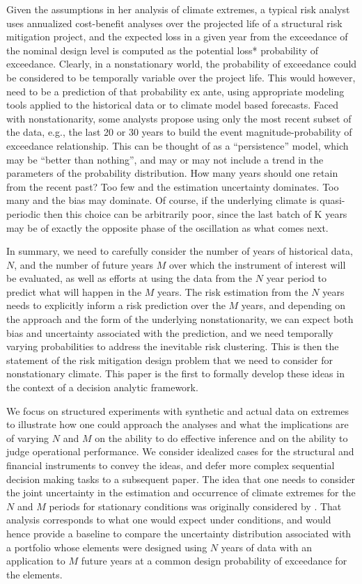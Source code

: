 \documentclass[11pt]{article}
\begin{document}
Given the \iid assumptions in her analysis of climate extremes, a typical risk analyst uses annualized cost-benefit analyses over the projected life of a structural risk mitigation project, and the expected loss in a given year from the exceedance of the nominal design level is computed as the potential loss* probability of exceedance. 
Clearly, in a nonstationary world, the probability of exceedance could be considered to be temporally variable over the project life. 
This would however, need to be a prediction of that probability ex ante, using appropriate modeling tools applied to the historical data or to climate model based forecasts. 
Faced with nonstationarity, some analysts propose using only the most recent subset of the data, e.g., the last 20 or 30 years to build the event magnitude-probability of exceedance relationship. 
This can be thought of as a ``persistence'' model, which may be ``better than nothing'', and may or may not include a trend in the parameters of the probability distribution. 
How many years should one retain from the recent past? 
Too few and the estimation uncertainty dominates.
Too many and the bias may dominate. 
Of course, if the underlying climate is quasi-periodic then this choice can be arbitrarily poor, since the last batch of K years may be of exactly the opposite phase of the oscillation as what comes next. 
 
In summary, we need to carefully consider the number of years of historical data, \(N\), and the number of future years \(M\) over which the instrument of interest will be evaluated, as well as efforts at using the data from the \(N\) year period to predict what will happen in the \(M\) years. 
The risk estimation from the \(N\) years needs to explicitly inform a risk prediction over the \(M\) years, and depending on the approach and the form of the underlying nonstationarity, we can expect both bias and uncertainty associated with the prediction, and we need temporally varying probabilities to address the inevitable risk clustering. 
This is then the statement of the risk mitigation design problem that we need to consider for nonstationary climate. 
This paper is the first to formally develop these ideas in the context of a decision analytic framework.

We focus on structured experiments with synthetic and actual data on extremes to illustrate how one could approach the analyses and what the implications are of varying \(N\) and \(M\) on the ability to do effective inference and on the ability to judge operational performance. 
We consider idealized cases for the structural and financial instruments to convey the ideas, and defer more complex sequential decision making tasks to a subsequent paper. 
The idea that one needs to consider the joint uncertainty in the estimation and occurrence of climate extremes for the \(N\) and \(M\) periods for stationary conditions was originally considered by \citet{Lall1987}. 
That analysis corresponds to what one would expect under \iid conditions, and would hence provide a baseline to compare the uncertainty distribution associated with a portfolio whose elements were designed using \(N\) years of data with an application to \(M\) future years at a common design probability of exceedance for the elements. 
\end{document}
